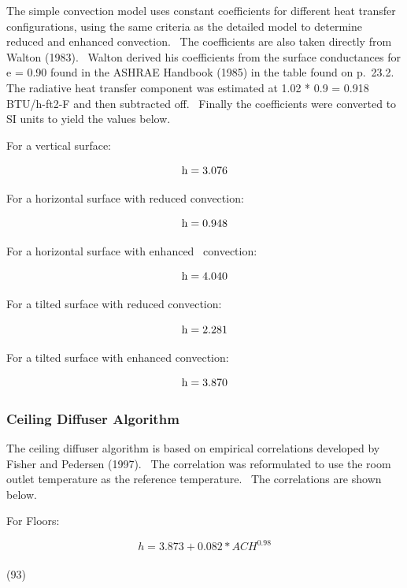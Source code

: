 The simple convection model uses constant coefficients for different heat transfer configurations, using the same criteria as the detailed model to determine reduced and enhanced convection.~ The coefficients are also taken directly from Walton (1983).~ Walton derived his coefficients from the surface conductances for e = 0.90 found in the ASHRAE Handbook (1985) in the table found on p.~23.2.~ The radiative heat transfer component was estimated at 1.02 * 0.9 = 0.918 BTU/h-ft2-F and then subtracted off.~ Finally the coefficients were converted to SI units to yield the values below.

For a vertical surface:

\begin{equation}
{\rm{h  =  3}}{\rm{.076}}
\end{equation}

For a horizontal surface with reduced convection:

\begin{equation}
{\rm{h  =  0}}{\rm{.948}}
\end{equation}

For a horizontal surface with enhanced~ convection:

\begin{equation}
{\rm{h  =  4}}{\rm{.040}}
\end{equation}

For a tilted surface with reduced convection:

\begin{equation}
{\rm{h  =  2}}{\rm{.281}}
\end{equation}

For a tilted surface with enhanced convection:

\begin{equation}
{\rm{h  =  3}}{\rm{.870}}
\end{equation}

\subsubsection{Ceiling Diffuser Algorithm}\label{ceiling-diffuser-algorithm}

The ceiling diffuser algorithm is based on empirical correlations developed by Fisher and Pedersen (1997).~ The correlation was reformulated to use the room outlet temperature as the reference temperature.~ The correlations are shown below.

For Floors:

\begin{equation}
h = 3.873 + 0.082 * AC{H^{0.98}}
\end{equation}
~~~~~~~~~~~~~~~~~~~~~~~~~~~~~~~~~~~~~~~~~~~~~~~~~~~~~~~~~~~~~~~~~~~~~ (93)

